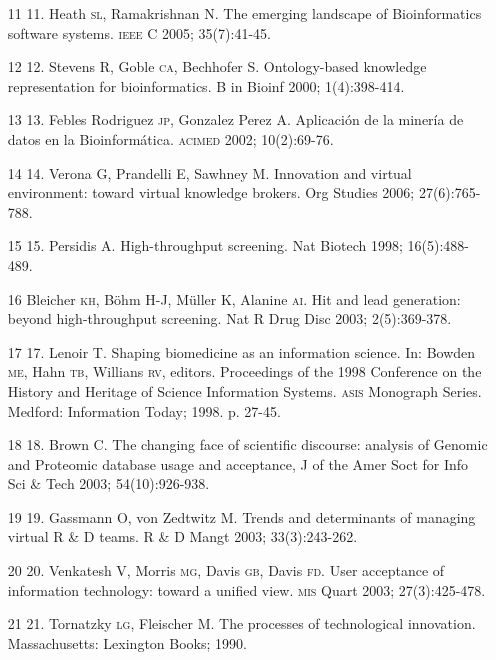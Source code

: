 \documentclass{article}
\begin{document}
\begin{itemize}
\item[11] 11. Heath \textsc{sl}, Ramakrishnan N. The emerging landscape of Bioinformatics
software systems. \textsc{ieee} C 2005; 35(7):41-45.

\item[12] 12. Stevens R, Goble \textsc{ca}, Bechhofer S. Ontology-based knowledge
representation for bioinformatics. B in Bioinf 2000; 1(4):398-414.

\item[13] 13. Febles Rodriguez \textsc{jp}, Gonzalez Perez A. Aplicación de la minería de
datos en la Bioinformática. \textsc{acimed} 2002; 10(2):69-76.

\item[14] 14. Verona G, Prandelli E, Sawhney M. Innovation and virtual
environment: toward virtual knowledge brokers. Org Studies 2006; 27(6):765-788.

\item[15] 15. Persidis A. High-throughput screening. Nat Biotech 1998;
16(5):488-489.

\item[] 16 Bleicher \textsc{kh}, Böhm H-J, Müller K, Alanine \textsc{ai}. Hit and lead generation:
beyond high-throughput screening. Nat R Drug Disc 2003; 2(5):369-378.

\item[17] 17. Lenoir T. Shaping biomedicine as an information science. In:
Bowden \textsc{me}, Hahn \textsc{tb}, Willians \textsc{rv}, editors. Proceedings of the 1998 Conference on
the History and Heritage of Science Information Systems. \textsc{asis} Monograph Series.
Medford: Information Today; 1998. p. 27-45.

\item[18] 18. Brown C. The changing face of scientific discourse: analysis of
Genomic and Proteomic database usage and acceptance, J of the Amer Soct for Info
Sci \& Tech 2003; 54(10):926-938.

\item[19] 19. Gassmann O, von Zedtwitz M. Trends and determinants of managing
virtual R \& D teams. R \& D Mangt 2003; 33(3):243-262.

\item[20] 20. Venkatesh V, Morris \textsc{mg}, Davis \textsc{gb}, Davis \textsc{fd}. User acceptance of
information technology: toward a unified view. \textsc{mis} Quart 2003; 27(3):425-478.

\item[21] 21. Tornatzky \textsc{lg}, Fleischer M. The processes of technological
innovation. Massachusetts: Lexington Books; 1990.


\end{itemize}
\end{document}
